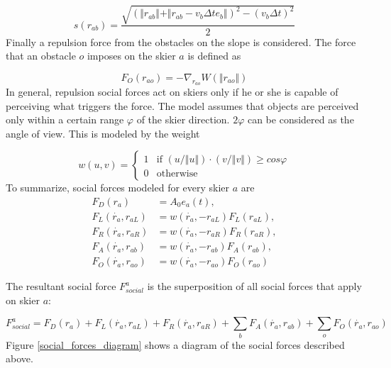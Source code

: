 \documentclass[12pt,a4paper,twoside]{book}
\begin{document}
\begin{equation}\label{skier_s}
s(r_{ab})=\frac{\sqrt{(\Vert r_{ab} \Vert + \Vert r_{ab}-v_b \Delta t e_b \Vert )^2-(v_b \Delta t)^2}}{2}
\end{equation}
Finally a repulsion force from the obstacles on the slope is considered. The force that an obstacle $o$ imposes on the skier $a$ is defined as

\begin{equation}\label{obstacle_force}
F_O(r_{ao})=-\nabla_{r_{ao}}W(\Vert r_{ao} \Vert )
\end{equation}
In general, repulsion social forces act on skiers only if he or she is capable of perceiving what triggers the force. The model assumes that objects are perceived only within a certain range $\varphi$ of the skier direction. $2\varphi$ can be considered as the angle of view. This is modeled by the weight

\begin{equation}\label{visibility}
w(u,v)=\begin{cases}
  1 & \text{if $(u/\Vert u \Vert)\cdot (v/\Vert v \Vert) \geq cos \varphi$} \\
  0 & \text{otherwise }
  \end{cases}
\end{equation}
To summarize, social forces modeled for every skier $a$ are
\begin{align}\label{social_forces_tb}
F_D(r_a)&=A_0 e_a(t),\\
F_L(\dot{r_a},r_{aL})&=w(\dot{r_a},-r_{aL})F_L(r_{aL}),\\
F_R(\dot{r_a},r_{aR})&=w(\dot{r_a},-r_{aR})F_R(r_{aR}),\\
F_A(\dot{r_a},r_{ab})&=w(\dot{r_a},-r_{ab})F_A(r_{ab}),\\
F_O(\dot{r_a},r_{ao})&=w(\dot{r_a},-r_{ao})F_O(r_{ao})
\end{align}

The resultant social force $F^a_{social}$ is the superposition of all social forces that apply on skier $a$:

\begin{equation}
F^a_{social}=F_D(r_a)+F_L(\dot{r_a},r_{aL})+F_R(\dot{r_a},r_{aR})+\sum_b F_A(\dot{r_a},r_{ab})+\sum_o F_O(\dot{r_a},r_{ao})\nonumber
\end{equation}
Figure \ref{social_forces_diagram} shows a diagram of the social forces described above.
\end{document}
